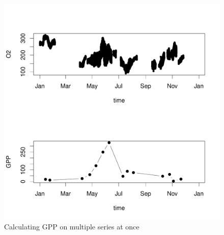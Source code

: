 \documentclass[10pt,a4wide]{article}
\begin{document}
\begin{figure}[h]
\begin{center}
\includegraphics{GPPFourier-GPPFourierFig2}

\end{center}
\caption{Calculating GPP on multiple series at once} 
\label{Fig2}
\end{figure}





\end{document}
